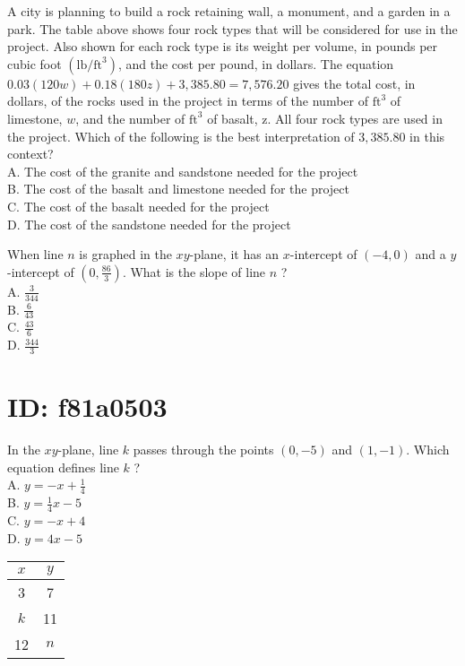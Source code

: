 A city is planning to build a rock retaining wall, a monument, and a garden in a park. The table above shows four rock types that will be considered for use in the project. Also shown for each rock type is its weight per volume, in pounds per cubic foot $\left(\mathrm{lb} / \mathrm{ft}^{3}\right)$, and the cost per pound, in dollars. The equation $0.03(120 w)+0.18(180 z)+3,385.80=7,576.20$ gives the total cost, in dollars, of the rocks used in the project in terms of the number of $\mathrm{ft}^{3}$ of limestone, $w$, and the number of $\mathrm{ft}^{3}$ of basalt, z. All four rock types are used in the project. Which of the following is the best interpretation of $3,385.80$ in this context?\\
A. The cost of the granite and sandstone needed for the project\\
B. The cost of the basalt and limestone needed for the project\\
C. The cost of the basalt needed for the project\\
D. The cost of the sandstone needed for the project

When line $n$ is graphed in the $x y$-plane, it has an $x$-intercept of $(-4,0)$ and a $y$-intercept of $\left(0, \frac{86}{3}\right)$. What is the slope of line $n$ ?\\
A. $\frac{3}{344}$\\
B. $\frac{6}{43}$\\
C. $\frac{43}{6}$\\
D. $\frac{344}{3}$

\section*{ID: f81a0503}
In the $x y$-plane, line $k$ passes through the points $(0,-5)$ and $(1,-1)$. Which equation defines line $k$ ?\\
A. $y=-x+\frac{1}{4}$\\
B. $y=\frac{1}{4} x-5$\\
C. $y=-x+4$\\
D. $y=4 x-5$

\begin{center}
\begin{tabular}{|c|c|}
\hline
$x$ & $y$ \\
\hline
3 & 7 \\
\hline
$k$ & 11 \\
\hline
12 & $n$ \\
\hline
\end{tabular}
\end{center}

